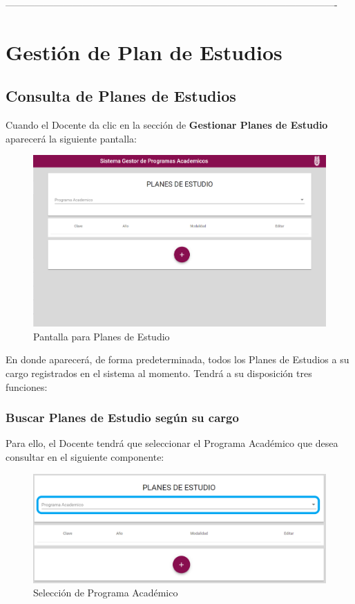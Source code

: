  -------------------------------------------------------------------------------------------------------

\chapter{Gestión de Plan de Estudios}
\section{Consulta de Planes de Estudios}
Cuando el Docente da clic en la sección de \textbf{Gestionar Planes de Estudio} aparecerá la siguiente pantalla:


\begin{figure}[!hbtp]
	\centering
	\hypertarget{consultarPE}{\includegraphics[width=0.7\linewidth]{images/SP4-GPE/consultar}}
	\caption{Pantalla para Planes de Estudio}
	\label{consultarPE}
\end{figure}

En donde aparecerá, de forma predeterminada, todos los Planes de Estudios a su cargo registrados en el sistema al momento. Tendrá a su disposición tres funciones:

\subsection{Buscar Planes de Estudio según su cargo}

Para ello, el Docente tendrá que seleccionar el Programa Académico que desea consultar en el siguiente componente:

\begin{figure}[!hbtp]
	\centering
	\hypertarget{academico}{\includegraphics[width=0.7\linewidth]{images/SP4-GPE/programa}}
	\caption{Selección de Programa Académico}
	\label{academico}
\end{figure}

